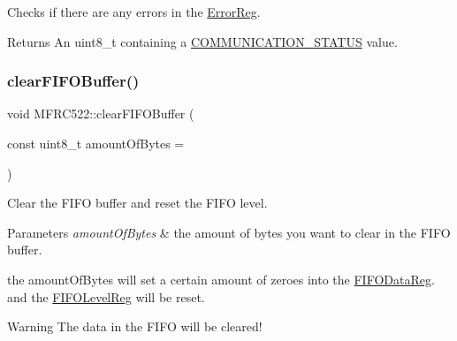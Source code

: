 Checks if there are any errors in the \mbox{\hyperlink{class_m_f_r_c522_ae7ec09eb8c9c61288a4770175b4b8db7a240aa03a1d9542235b89cdef377a5796}{Error\+Reg}}. 

\begin{DoxyReturn}{Returns}
An uint8\+\_\+t containing a \mbox{\hyperlink{class_m_f_r_c522_a1160642f3b2b60b5ea7309374a8d760a}{C\+O\+M\+M\+U\+N\+I\+C\+A\+T\+I\+O\+N\+\_\+\+S\+T\+A\+T\+US}} value. 
\end{DoxyReturn}
\mbox{\label{class_m_f_r_c522_a0fa1703360d0c741cf915b22e26c2631}} 
\subsubsection{\texorpdfstring{clear\+F\+I\+F\+O\+Buffer()}{clearFIFOBuffer()}}
{\footnotesize\ttfamily void M\+F\+R\+C522\+::clear\+F\+I\+F\+O\+Buffer (\begin{DoxyParamCaption}\item[{const uint8\+\_\+t}]{amount\+Of\+Bytes = {} }\end{DoxyParamCaption})\hspace{0.3cm}{\ttfamily [private]}}



Clear the F\+I\+FO buffer and reset the F\+I\+FO level. 


\begin{DoxyParams}{Parameters}
{\em amount\+Of\+Bytes} & the amount of bytes you want to clear in the F\+I\+FO buffer.\\
\hline
\end{DoxyParams}
the amount\+Of\+Bytes will set a certain amount of zeroes into the \mbox{\hyperlink{class_m_f_r_c522_ae7ec09eb8c9c61288a4770175b4b8db7afdbfd2f397b96d1043c808ec26e80328}{F\+I\+F\+O\+Data\+Reg}}. and the \mbox{\hyperlink{class_m_f_r_c522_ae7ec09eb8c9c61288a4770175b4b8db7a35e5daf30358a0a271dadf50ba6bb4e7}{F\+I\+F\+O\+Level\+Reg}} will be reset. \begin{DoxyWarning}{Warning}
The data in the F\+I\+FO will be cleared! 
\end{DoxyWarning}
\mbox{\label{class_m_f_r_c522_a9d2c5ad7b977944e8bcbbcc9c1bb9b75}} 
